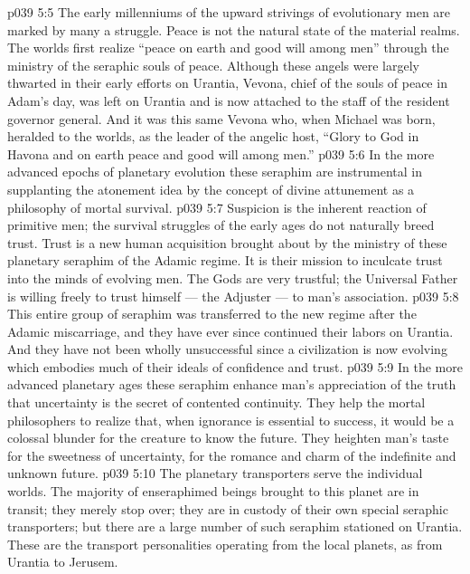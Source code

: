 \vs p039 5:5 \pc {}\bibnobreakspace {} The early millenniums of the upward strivings of evolutionary men are marked by many a struggle. Peace is not the natural state of the material realms. The worlds first realize “peace on earth and good will among men” through the ministry of the seraphic souls of peace. Although these angels were largely thwarted in their early efforts on Urantia, Vevona, chief of the souls of peace in Adam’s day, was left on Urantia and is now attached to the staff of the resident governor general. And it was this same Vevona who, when Michael was born, heralded to the worlds, as the leader of the angelic host, “Glory to God in Havona and on earth peace and good will among men.”
\vs p039 5:6 In the more advanced epochs of planetary evolution these seraphim are instrumental in supplanting the atonement idea by the concept of divine attunement as a philosophy of mortal survival.
\vs p039 5:7 \pc {}\bibnobreakspace {} Suspicion is the inherent reaction of primitive men; the survival struggles of the early ages do not naturally breed trust. Trust is a new human acquisition brought about by the ministry of these planetary seraphim of the Adamic regime. It is their mission to inculcate trust into the minds of evolving men. The Gods are very trustful; the Universal Father is willing freely to trust himself --- the Adjuster --- to man’s association.
\vs p039 5:8 This entire group of seraphim was transferred to the new regime after the Adamic miscarriage, and they have ever since continued their labors on Urantia. And they have not been wholly unsuccessful since a civilization is now evolving which embodies much of their ideals of confidence and trust.
\vs p039 5:9 In the more advanced planetary ages these seraphim enhance man’s appreciation of the truth that uncertainty is the secret of contented continuity. They help the mortal philosophers to realize that, when ignorance is essential to success, it would be a colossal blunder for the creature to know the future. They heighten man’s taste for the sweetness of uncertainty, for the romance and charm of the indefinite and unknown future.
\vs p039 5:10 \pc {}\bibnobreakspace {} The planetary transporters serve the individual worlds. The majority of enseraphimed beings brought to this planet are in transit; they merely stop over; they are in custody of their own special seraphic transporters; but there are a large number of such seraphim stationed on Urantia. These are the transport personalities operating from the local planets, as from Urantia to Jerusem.
